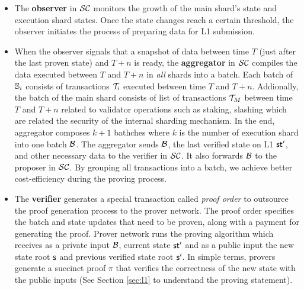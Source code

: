 \begin{itemize}
	\item The \textbf{observer} in ${\mathcal{SC}}$ monitors the
	      growth of the
	      main shard's state and execution shard states. Once the
	      state changes
	      reach a certain threshold, the observer initiates the
	      process of preparing
	      data for L1 submission.
	\item When the observer signals that a snapshot of data between
	      time $T$ (just after the last proven state) and $T + n$ is
	      ready, the
	      \textbf{aggregator} in ${\mathcal{SC}}$ compiles the data executed
	      between $T$
	      and $T+n$ in \emph{all} shards into a batch. Each batch of
	      $\mathbb{S}_i$ consists of
	      transactions ${\mathcal{T}}_i$ executed between time $T $ and
	      $T+n$.
	      Addionally, the batch of the main shard consists of list of
	      transactions ${\mathcal{T}}_M$
	      between time $T$ and $T+n$ related to
	      validator operations such as staking, slashing
	      which are related the security of the internal sharding
	      mechanism. In the
	      end, aggregator composes	$k+1$ bathches where $k$ is the
	      number of
	      execution shard into one batch $\mathcal{B}$.
	      The aggregator sends $\mathcal{B}$, the last verified state on L1
	      $\mathsf{st}'$, and other necessary data to the verifier	in
	      ${\mathcal{SC}}$. It also forwards $\mathcal{B}$ to the
	      proposer in ${\mathcal{SC}}$.
	      By grouping all transactions into a batch, we achieve better
	      cost-efficiency during the proving process.
	\item The \textbf{verifier} generates a special transaction called
	      \emph{proof order} to outsource the proof generation process
	      to the prover
	      network.	The proof order specifies the batch and state
	      updates that need
	      to be proven, along with a payment for generating the proof.
	      Prover
	      network runs the proving algorithm which receives as a
	      private input
	      $\mathcal{B}$, current state $\mathsf{st}'$ and as a public input
	      the new state root $\mathsf{s}$ and previous
	      verified state root $\mathsf{s}'$. In simple terms, provers
	      generate a succinct proof $\pi$ that verifies the
	      correctness of the new
	      state with the public inputs (See Section \ref{sec:l1} to
	      understand the
	      proving statement).


\end{itemize}
